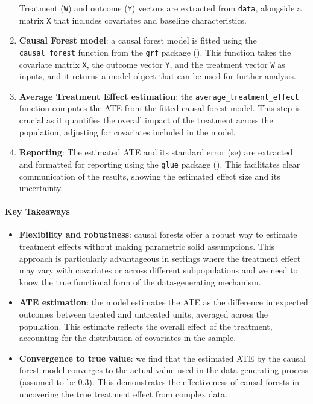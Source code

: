 \documentclass[
  singlecolumn]{article}
\let\oldparagraph\paragraph
\renewcommand{\paragraph}[1]{\oldparagraph{#1}\mbox{}}
\begin{document}
\begin{enumerate}
  Treatment (\texttt{W}) and outcome (\texttt{Y}) vectors are extracted
  from \texttt{data}, alongside a matrix \texttt{X} that includes
  covariates and baseline characteristics.
\item
  \textbf{Causal Forest model}: a causal forest model is fitted using
  the \texttt{causal\_forest} function from the \texttt{grf} package
  (). This function
  takes the covariate matrix \texttt{X}, the outcome vector \texttt{Y},
  and the treatment vector \texttt{W} as inputs, and it returns a model
  object that can be used for further analysis.
\item
  \textbf{Average Treatment Effect estimation}: the
  \texttt{average\_treatment\_effect} function computes the ATE from the
  fitted causal forest model. This step is crucial as it quantifies the
  overall impact of the treatment across the population, adjusting for
  covariates included in the model.
\item
  \textbf{Reporting}: The estimated ATE and its standard error (se) are
  extracted and formatted for reporting using the \texttt{glue} package
  (). This
  facilitates clear communication of the results, showing the estimated
  effect size and its uncertainty.
\end{enumerate}

\paragraph{Key Takeaways}\label{key-takeaways}

\begin{itemize}
\item
  \textbf{Flexibility and robustness}: causal forests offer a robust way
  to estimate treatment effects without making parametric solid
  assumptions. This approach is particularly advantageous in settings
  where the treatment effect may vary with covariates or across
  different subpopulations and we need to know the true functional form
  of the data-generating mechanism.
\item
  \textbf{ATE estimation}: the model estimates the ATE as the difference
  in expected outcomes between treated and untreated units, averaged
  across the population. This estimate reflects the overall effect of
  the treatment, accounting for the distribution of covariates in the
  sample.
\item
  \textbf{Convergence to true value}: we find that the estimated ATE by
  the causal forest model converges to the actual value used in the
  data-generating process (assumed to be 0.3). This demonstrates the
  effectiveness of causal forests in uncovering the true treatment
  effect from complex data.
\end{itemize}
\end{document}
